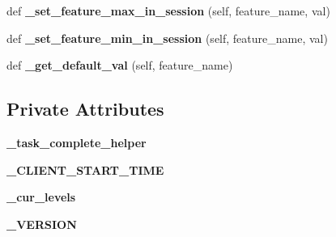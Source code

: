 \begin{DoxyCompactItemize}
def {\bfseries \+\_\+set\+\_\+feature\+\_\+max\+\_\+in\+\_\+session} (self, feature\+\_\+name, val)
\item 
\mbox{\label{classfeature__extractors_1_1_jowilder_extractor_1_1_jowilder_extractor_a9252c9cbf8a694d1fe97d899bf2119bd}} 
def {\bfseries \+\_\+set\+\_\+feature\+\_\+min\+\_\+in\+\_\+session} (self, feature\+\_\+name, val)
\item 
\mbox{\label{classfeature__extractors_1_1_jowilder_extractor_1_1_jowilder_extractor_a19e8959179d7673ec3aa5682e9486345}} 
def {\bfseries \+\_\+get\+\_\+default\+\_\+val} (self, feature\+\_\+name)
\end{DoxyCompactItemize}
\subsection*{Private Attributes}
\begin{DoxyCompactItemize}
\item 
\mbox{\label{classfeature__extractors_1_1_jowilder_extractor_1_1_jowilder_extractor_a5a6a20e020edae0360b7fd47f3dfa50d}} 
{\bfseries \+\_\+task\+\_\+complete\+\_\+helper}
\item 
\mbox{\label{classfeature__extractors_1_1_jowilder_extractor_1_1_jowilder_extractor_a22d53af09401a7f19358543a69067b9d}} 
{\bfseries \+\_\+\+C\+L\+I\+E\+N\+T\+\_\+\+S\+T\+A\+R\+T\+\_\+\+T\+I\+ME}
\item 
\mbox{\label{classfeature__extractors_1_1_jowilder_extractor_1_1_jowilder_extractor_a827b691568639be61eebe6efb7c22c92}} 
{\bfseries \+\_\+cur\+\_\+levels}
\item 
\mbox{\label{classfeature__extractors_1_1_jowilder_extractor_1_1_jowilder_extractor_ad4f635918432cfb79ae1c6473bff904a}} 
{\bfseries \+\_\+\+V\+E\+R\+S\+I\+ON}
\end{DoxyCompactItemize}
